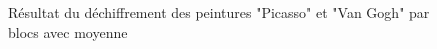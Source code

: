 \documentclass[a4paper]{article}
\begin{document}
\begin{figure}[htbp]
\begin{center}
{                        \label{subfig:vangogh_a_10}}
                    \caption{Résultat du déchiffrement des peintures "Picasso" et "Van Gogh" par blocs avec moyenne}
                    \label{fig:res_average}
                \end{center}
            \end{figure}
\end{document}
